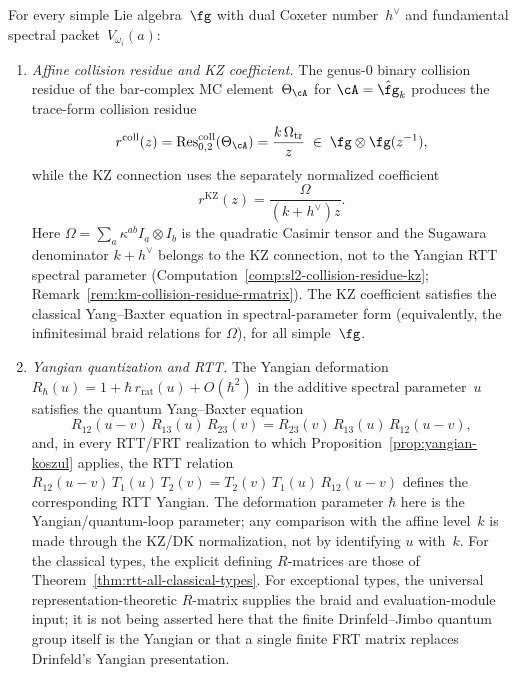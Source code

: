 \begin{theorem}%
\label{thm:all-types-yangian-structure}
For every simple Lie algebra~$\fg$ with dual Coxeter number~$h^\vee$ and
fundamental spectral packet~$V_{\omega_i}(a)$:
\begin{enumerate}[label=\textup{(\roman*)}]
\item \emph{Affine collision residue and KZ coefficient.}
 The genus-$0$ binary collision residue of the bar-complex MC
 element~$\Theta_\cA$ for $\cA = \hat{\fg}_k$ produces the
 trace-form collision residue
 \begin{equation}\label{eq:r-matrix-all-types}
 r^{\mathrm{coll}}(z)
 = \operatorname{Res}^{\mathrm{coll}}_{0,2}(\Theta_\cA)
 = \frac{k\,\Omega_{\mathrm{tr}}}{z}
 \;\in\; \fg \otimes \fg(z^{-1}),
 \end{equation}
 while the KZ connection uses the separately normalized coefficient
 \[
 r^{\mathrm{KZ}}(z)=\frac{\Omega}{(k+h^\vee)z}.
 \]
 Here $\Omega=\sum_a\kappa^{ab}I_a\otimes I_b$ is the quadratic
 Casimir tensor and the Sugawara denominator $k+h^\vee$ belongs to
 the KZ connection, not to the Yangian RTT spectral parameter
 (Computation~\ref{comp:sl2-collision-residue-kz};
 Remark~\ref{rem:km-collision-residue-rmatrix}).  The KZ coefficient
 satisfies
 the classical Yang--Baxter equation in spectral-parameter form
 \textup{(}equivalently, the infinitesimal braid relations for
 $\Omega$\textup{)}, for all simple~$\fg$.

\item \emph{Yangian quantization and RTT.}
 The Yangian deformation
 $R_\hbar(u)=1+\hbar\,r_{\mathrm{rat}}(u)+O(\hbar^2)$
 in the additive spectral parameter~$u$
 satisfies the quantum Yang--Baxter equation
 \[
 R_{12}(u{-}v)\, R_{13}(u)\, R_{23}(v)
 = R_{23}(v)\, R_{13}(u)\, R_{12}(u{-}v),
 \]
 and, in every RTT/FRT realization to which
 Proposition~\ref{prop:yangian-koszul} applies, the RTT relation
 $R_{12}(u{-}v)\, T_1(u)\, T_2(v)
 = T_2(v)\, T_1(u)\, R_{12}(u{-}v)$
 defines the corresponding RTT Yangian.  The deformation parameter
 $\hbar$ here is the Yangian/quantum-loop parameter; any comparison
 with the affine level~$k$ is made through the KZ/DK normalization,
 not by identifying $u$ with~$k$. For the classical types, the
 explicit defining $R$-matrices are those of
 Theorem~\textup{\ref{thm:rtt-all-classical-types}}. For exceptional
 types, the universal representation-theoretic $R$-matrix supplies
 the braid and evaluation-module input; it is not being asserted here
 that the finite Drinfeld--Jimbo quantum group itself is the Yangian
 or that a single finite FRT matrix replaces Drinfeld's Yangian
 presentation.


\end{enumerate}
\end{theorem}
